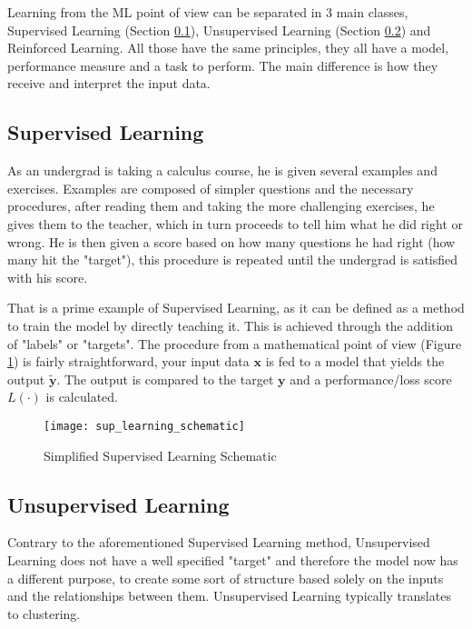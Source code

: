 Learning from the ML point of view can be separated in 3 main classes, Supervised Learning (Section \ref{sec:sup_learning}), Unsupervised Learning (Section \ref{sec:unsup_learning}) and Reinforced Learning. All those have the same principles, they all have a model, performance measure and a task to perform. The main difference is how they receive and interpret the input data.


\subsection{Supervised Learning}\label{sec:sup_learning}

As an undergrad is taking a calculus course, he is given several examples and exercises. Examples are composed of simpler questions and the necessary procedures, after reading them and taking the more challenging exercises, he gives them to the teacher, which in turn proceeds to tell him what he did right or wrong. He is then given a score based on how many questions he had right (how many hit the "target"), this procedure is repeated until the undergrad is satisfied with his score.

That is a prime example of Supervised Learning, as it can be defined as a method to train the model by directly teaching it. This is achieved through the addition of "labels" or "targets". The procedure from a mathematical point of view (Figure \ref{fig:sup_learning}) is fairly straightforward, your input data $\textbf{x}$ is fed to a model that yields the output $\tilde{\textbf{y}}$. The output is compared to the target $\textbf{y}$ and a performance/loss score $L(\cdot)$ is calculated.

\begin{figure}[H]
	\centering
	\texttt{[image: sup\_learning\_schematic]}
	\caption{Simplified Supervised Learning Schematic}
	\label{fig:sup_learning}
\end{figure}

\subsection{Unsupervised Learning}\label{sec:unsup_learning}

Contrary to the aforementioned Supervised Learning method, Unsupervised Learning does not have a well specified "target" and therefore the model now has a different purpose, to create some sort of structure based solely on the inputs and the relationships between them. Unsupervised Learning typically translates to clustering.

